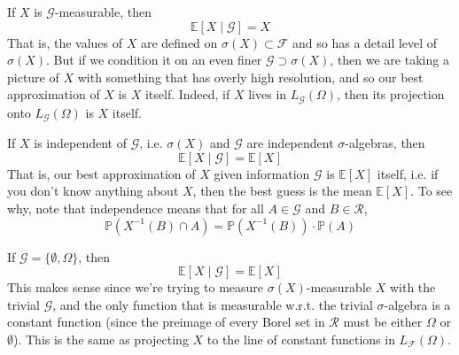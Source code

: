   \begin{theorem}
    If $X$ is $\mathcal{G}$-measurable, then 
    \begin{equation}
      \mathbb{E}[X \mid \mathcal{G}] = X
    \end{equation}
    That is, the values of $X$ are defined on $\sigma(X) \subset \mathcal{F}$ and so has a detail level of $\sigma(X)$. But if we condition it on an even finer $\mathcal{G} \supset \sigma(X)$, then we are taking a picture of $X$ with something that has overly high resolution, and so our best approximation of $X$ is $X$ itself. Indeed, if $X$ lives in $L_\mathcal{G} (\Omega)$, then its projection onto $L_\mathcal{G} (\Omega)$ is $X$ itself. 
  \end{theorem}

  \begin{theorem}
    If $X$ is independent of $\mathcal{G}$, i.e. $\sigma(X)$ and $\mathcal{G}$ are independent $\sigma$-algebras, then 
    \begin{equation}
      \mathbb{E}[X \mid \mathcal{G}] = \mathbb{E}[X]
    \end{equation}
    That is, our best approximation of $X$ given information $\mathcal{G}$ is $\mathbb{E}[X]$ itself, i.e. if you don't know anything about $X$, then the best guess is the mean $\mathbb{E}[X]$. To see why, note that independence means that for all $A \in \mathcal{G}$ and $B \in \mathcal{R}$, 
    \begin{equation}
      \mathbb{P}(X^{-1} (B) \cap A) = \mathbb{P}(X^{-1}(B)) \cdot \mathbb{P}(A)
    \end{equation}
  \end{theorem}

  \begin{theorem}
    If $\mathcal{G} = \{\emptyset, \Omega\}$, then 
    \begin{equation}
      \mathbb{E}[X \mid \mathcal{G}] = \mathbb{E}[X]
    \end{equation}
    This makes sense since we're trying to measure $\sigma(X)$-measurable $X$ with the trivial $\mathcal{G}$, and the only function that is measurable w.r.t. the trivial $\sigma$-algebra is a constant function (since the preimage of every Borel set in $\mathcal{R}$ must be either $\Omega$ or $\emptyset$). This is the same as projecting $X$ to the line of constant functions in $L_\mathcal{F}(\Omega)$. 
  \end{theorem}

